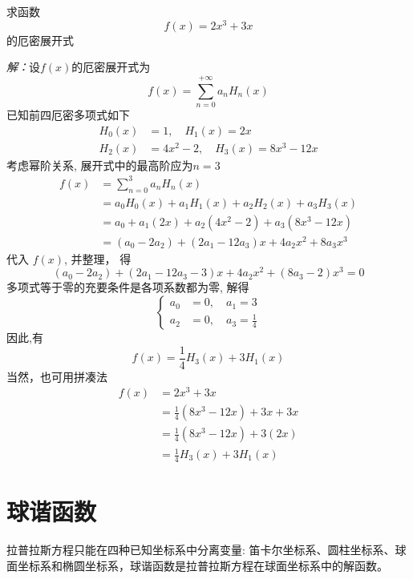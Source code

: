 \begin{example}
	求函数
	\[ f(x) =2x^3 +3x \] 
	的厄密展开式
\end{example}
   \emph{解：}设$f(x)$的厄密展开式为
	\[ f(x) = \sum_{n=0}^{+\infty} a_n H_n(x) \] 
	已知前四厄密多项式如下
	\[\begin{aligned} H_0 (x) &= 1,\quad H_1 (x) = 2x \\ H_2 (x) &= 4x^2 -2, \quad  H_3 (x) = 8x^3 -12x \end{aligned}\]
	考虑幂阶关系, 展开式中的最高阶应为$n=3$
	\[
	\begin{aligned}
		f(x) & = \sum_{n=0}^{3} a_n H_n(x) \\ 
		&= a_0 H_0(x) + a_1 H_1(x) + a_2 H_2(x) +  a_3 H_3(x) \\
		&= a_0 + a_1 (2x) + a_2 (4x^2 -2)  + a_3 (8x^3 -12x) \\
		&= (a_0 -2 a_2) + (2 a_1 - 12a_3 )x +  4 a_2 x^2 + 8a_3 x^3 
	\end{aligned}
	\]
	代入 $f(x)$, 并整理， 得
	\[ (a_0 -2 a_2) + (2 a_1 - 12a_3 -3)x +  4 a_2 x^2 + (8a_3 -2) x^3 = 0 \]
	多项式等于零的充要条件是各项系数都为零, 解得
	\[\left\{
	\begin{aligned}
		a_0 &= 0, \quad 
		a_1 = 3\\
		a_2 &= 0, \quad 
		a_3 = \frac{1}{4}
	\end{aligned} \right.
	\]
	因此,有 
	\[ f(x) =   \frac{1}{4} H_3(x)+ 3 H_1(x)\] 
	当然，也可用拼凑法
   \[
  \begin{aligned}
   f(x) &= 2x^3 +3x \\
   &= \frac{1}{4}(8x^3 -12x)+ 3x +3x \\
   &= \frac{1}{4}(8x^3 -12x)+ 3(2x) \\
   &= \frac{1}{4} H_3(x) + 3H_1(x)
  \end{aligned}
	\]

\section{球谐函数}
拉普拉斯方程只能在四种已知坐标系中分离变量: 笛卡尔坐标系、圆柱坐标系、球面坐标系和椭圆坐标系，球谐函数是拉普拉斯方程在球面坐标系中的解函数。

